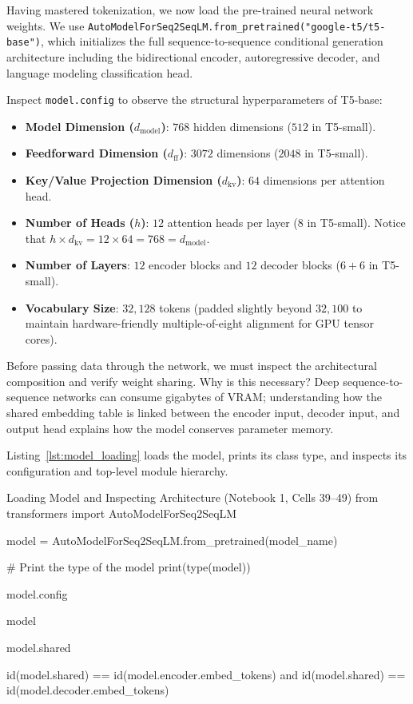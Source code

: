 \documentclass[11pt,a4paper]{article}
\begin{document}
Having mastered tokenization, we now load the pre-trained neural network weights. We use \texttt{AutoModelForSeq2SeqLM.from\_pretrained("google-t5/t5-base")}, which initializes the full sequence-to-sequence conditional generation architecture including the bidirectional encoder, autoregressive decoder, and language modeling classification head. 

Inspect \texttt{model.config} to observe the structural hyperparameters of T5-base:
\begin{itemize}
    \item \textbf{Model Dimension ($d_{\text{model}}$)}: $768$ hidden dimensions ($512$ in T5-small).
    \item \textbf{Feedforward Dimension ($d_{\text{ff}}$)}: $3072$ dimensions ($2048$ in T5-small).
    \item \textbf{Key/Value Projection Dimension ($d_{\text{kv}}$)}: $64$ dimensions per attention head.
    \item \textbf{Number of Heads ($h$)}: $12$ attention heads per layer ($8$ in T5-small). Notice that $h \times d_{\text{kv}} = 12 \times 64 = 768 = d_{\text{model}}$.
    \item \textbf{Number of Layers}: $12$ encoder blocks and $12$ decoder blocks ($6 + 6$ in T5-small).
    \item \textbf{Vocabulary Size}: $32{,}128$ tokens (padded slightly beyond $32{,}100$ to maintain hardware-friendly multiple-of-eight alignment for GPU tensor cores).
\end{itemize}

Before passing data through the network, we must inspect the architectural composition and verify weight sharing. Why is this necessary? Deep sequence-to-sequence networks can consume gigabytes of VRAM; understanding how the shared embedding table is linked between the encoder input, decoder input, and output head explains how the model conserves parameter memory.

Listing~\ref{lst:model_loading} loads the model, prints its class type, and inspects its configuration and top-level module hierarchy.

\begin{solutioncode}[label=lst:model_loading]{Loading Model and Inspecting Architecture (Notebook 1, Cells 39--49)}
from transformers import AutoModelForSeq2SeqLM

model = AutoModelForSeq2SeqLM.from_pretrained(model_name)

# Print the type of the model
print(type(model))

model.config

model

model.shared

id(model.shared) == id(model.encoder.embed_tokens) and id(model.shared) == id(model.decoder.embed_tokens)
\end{solutioncode}
\end{document}
